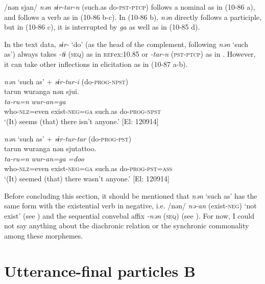/nən sjan/ \textit{nən} \textit{sɨr-tar-n} (such.as do-\textsc{pst}-\textsc{ptcp}) follows a nominal as in (10-86 a), and follows a verb as in (10-86 b-c). In (10-86 b), \textit{nən} directly follows a participle, but in (10-86 c), it is interrupted by \textit{ga} as well as in (10-85 d).

  In the text data, \textit{sɨr-} ‘do’ (as the head of the complement, following \textit{nən} ‘such as’) always takes \textit{{}-tɨ} (\textsc{seq}) as in \textsc{ref}{ex:10.85} or \textit{{}-tar-n} (\textsc{pst}-\textsc{ptcp}) as in . However, it can take other inflections in elicitation as in (10-87 a-b).

\ea\label{ex:10.87}   
\ea \textit{nən} ‘such as’ + \textit{sɨr-tur-i} (do-\textsc{prog}-\textsc{npst})\\
      \glll    tarun  wuranga  nən  sjui.\\
    \textit{ta-ru=n}  \textit{wur-an=ga}  \textit{}  \textit{}\\
    who-\textsc{nlz}=even  exist-\textsc{neg}=\textsc{ga}  such.as  do-\textsc{prog}-\textsc{npst}\\
    \glt     ‘(It) seems (that) there isn’t anyone.’ [El: 120914]

  \ex \textit{nən} ‘such as’ + \textit{sɨr-tur-tar} (do-\textsc{prog}-\textsc{pst})\\
      \glll    tarun  wuranga  nən  sjutattoo.\\
    \textit{ta-ru=n}  \textit{wur-an=ga}  \textit{}  \textit{=doo}\\
    who-\textsc{nlz}=even  exist-\textsc{neg}=\textsc{ga}  such.as  do-\textsc{prog}-\textsc{pst}=\textsc{ass}\\
    \glt     ‘(It) seemed (that) there wasn’t anyone.’ [El: 120914]
    \z
\z

  Before concluding this section, it should be mentioned that \textit{nən} ‘such as’ has the same form with the existential verb in negative, i.e. /nən/ \textit{nə-an} (exist-\textsc{neg}) ‘not exist’ (see ) and the sequential convebal affix \textit{{}-nən} (\textsc{seq}) (see ). For now, I could not say anything about the diachronic relation or the synchronic commonality among these morphemes.

\section{Utterance-final particles B}\label{sec:10.5}

